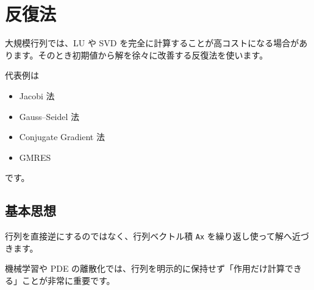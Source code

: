 \documentclass[
  11pt,
  a4paper,
]{ltjsarticle}
\author{}
\date{}
\providecommand{\tightlist}{%
  \setlength{\itemsep}{0pt}\setlength{\parskip}{0pt}}
\begin{document}
\hypertarget{ux53cdux5fa9ux6cd5}{%
\section{反復法}\label{ux53cdux5fa9ux6cd5}}

大規模行列では、LU や SVD
を完全に計算することが高コストになる場合があります。そのとき初期値から解を徐々に改善する反復法を使います。

代表例は

\begin{itemize}
\tightlist
\item
  Jacobi 法
\item
  Gauss--Seidel 法
\item
  Conjugate Gradient 法
\item
  GMRES
\end{itemize}

です。

\hypertarget{ux57faux672cux601dux60f3}{%
\subsection{基本思想}\label{ux57faux672cux601dux60f3}}

行列を直接逆にするのではなく、行列ベクトル積 \texttt{Ax}
を繰り返し使って解へ近づきます。

機械学習や PDE
の離散化では、行列を明示的に保持せず「作用だけ計算できる」ことが非常に重要です。
\end{document}
